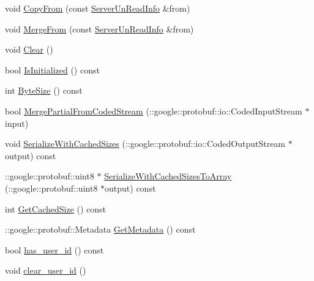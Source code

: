 \begin{DoxyCompactItemize}
\item 
void \hyperlink{class_i_m_1_1_base_define_1_1_server_un_read_info_a5db33bca7d0cb80ec18cf091f9ee4d69}{Copy\+From} (const \hyperlink{class_i_m_1_1_base_define_1_1_server_un_read_info}{Server\+Un\+Read\+Info} \&from)
\item 
void \hyperlink{class_i_m_1_1_base_define_1_1_server_un_read_info_af8f1dbbe259eb3fa5de5a4840a3af8b6}{Merge\+From} (const \hyperlink{class_i_m_1_1_base_define_1_1_server_un_read_info}{Server\+Un\+Read\+Info} \&from)
\item 
void \hyperlink{class_i_m_1_1_base_define_1_1_server_un_read_info_a866097c4dab71d81ba21abe322efdf07}{Clear} ()
\item 
bool \hyperlink{class_i_m_1_1_base_define_1_1_server_un_read_info_ac899373561938e69958038fdcaf37324}{Is\+Initialized} () const 
\item 
int \hyperlink{class_i_m_1_1_base_define_1_1_server_un_read_info_a3aac11390c73599344c36be8121b69a2}{Byte\+Size} () const 
\item 
bool \hyperlink{class_i_m_1_1_base_define_1_1_server_un_read_info_a8276bb5edc26dadbfe12798be2fd3160}{Merge\+Partial\+From\+Coded\+Stream} (\+::google\+::protobuf\+::io\+::\+Coded\+Input\+Stream $\ast$input)
\item 
void \hyperlink{class_i_m_1_1_base_define_1_1_server_un_read_info_a1b594289dfeb49c900a53f6198c3375e}{Serialize\+With\+Cached\+Sizes} (\+::google\+::protobuf\+::io\+::\+Coded\+Output\+Stream $\ast$output) const 
\item 
\+::google\+::protobuf\+::uint8 $\ast$ \hyperlink{class_i_m_1_1_base_define_1_1_server_un_read_info_add9664d01091fa9adf6f0af8d24861f0}{Serialize\+With\+Cached\+Sizes\+To\+Array} (\+::google\+::protobuf\+::uint8 $\ast$output) const 
\item 
int \hyperlink{class_i_m_1_1_base_define_1_1_server_un_read_info_a3e401a7c43315743092d66f37cf5e8f9}{Get\+Cached\+Size} () const 
\item 
\+::google\+::protobuf\+::\+Metadata \hyperlink{class_i_m_1_1_base_define_1_1_server_un_read_info_af2c7b937c609bcf7d9e7ed908ccd825e}{Get\+Metadata} () const 
\item 
bool \hyperlink{class_i_m_1_1_base_define_1_1_server_un_read_info_a9ed7a586c0e707a2a40411eb50e9fbd1}{has\+\_\+user\+\_\+id} () const 
\item 
void \hyperlink{class_i_m_1_1_base_define_1_1_server_un_read_info_a888c6ae3c1fd7b8818f1a70cb5e61ac4}{clear\+\_\+user\+\_\+id} ()
\item 

\end{DoxyCompactItemize}
